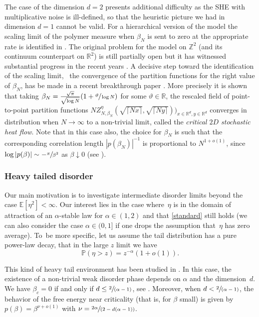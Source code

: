 \documentclass[JEP,XML,SOM,Unicode,published]{cedram}
\newcommand{\spfrac}[2]{\sfrac{#1}{(#2)}}
\theoremstyle{definition}
\newcommand{\bbE}{{\ensuremath{\mathbb E}} }
\newcommand{\bbP}{{\ensuremath{\mathbb P}} }
\newcommand{\bbR}{{\ensuremath{\mathbb R}} }
\newcommand{\bbZ}{{\ensuremath{\mathbb Z}} }
\let\ga\alpha
\let\gb\beta
\begin{document}
The case of the dimension $d=2$ presents additional difficulty as the SHE with multiplicative noise is ill-defined, so that the heuristic picture we had in dimension $d=1$ cannot be valid.
For a hierarchical version of the model
the scaling limit of the polymer measure when $\beta_N$ is sent to zero at the appropriate rate is identified in \cite{clark2019}. The original problem for the model on $\bbZ^2$ (and its continuum counterpart on $\bbR^2$) is still partially open but it has witnessed substantial progress in the recent years \cite{CSZ15, CSZ18scaling, gu2019}. A decisive step toward the identification of the scaling limit, \ie \ the convergence of the partition functions for the right value of $\beta_N$, has be made in a recent breakthrough paper \cite{CSZ21}.
More precisely it is shown that taking
$\beta_N = \frac{\sqrt{\pi}}{\sqrt{\log N}} (1+ \sfrac{\vartheta}{\log N})$ for some $\vartheta\in \bbR$,
the rescaled
field of point-to-point partition functions
$N Z^{\eta}_{N, \beta_N}(\sqrt{\lceil Nx\rceil},\sqrt{\lceil Ny \rceil}))_{x\in \bbR^d, y\in \bbR^d}$ converges in distribution when $N\to \infty$ to a non-trivial limit, called the \emph{critical $2D$ stochastic heat flow}.
Note that in this case also, the choice for $\beta_N$ is such that the corresponding correlation length $|p(\beta_N)|^{-1}$ is proportional to $N^{1+o(1)}$,
since $\log |p(\beta)| \sim - \sfrac{\pi}{\gb^2}$ as $\gb\downarrow0$ (see \cite{BL17}).

\subsubsection*{Heavy tailed disorder}
Our main motivation is to investigate intermediate disorder limits beyond the case $\bbE[ \eta^2]<\infty$.
Our interest lies in the case where~$\eta$ is in the domain of attraction of an $\alpha$-stable law for $\alpha\in (1,2)$ and that \eqref{standard} still holds (we can also consider the case $\alpha\in(0,1]$ if one drops the assumption that~$\eta$ has zero average). To~be more specific, let us assume the tail distribution has a pure power-law decay, \ie that in the large $z$ limit we have
\begin{equation}
\label{def:eta}
\bbP(\eta> z) = z^{-\alpha}(1+o(1)).
\end{equation}

This kind of heavy tail environment has been studied in \cite{Vi19}. In this case, the existence of a non-trivial weak disorder phase depends on $\alpha$ and the dimension~$d$. We have $\gb_c=0$
if and only if $d\leq \spfrac{2}{\ga-1}$,
see \cite[Th.\,1.1]{Vi19}.
Moreover, when $d<\nobreak \spfrac{2}{\alpha-1}$,
the behavior of the free energy near criticality (that is, for $\beta$ small) is given by
$p(\beta)=\beta^{\nu+o(1)}$ with $\nu =\spfrac{2\alpha}{2-d(\alpha-1)}$.
\end{document}
